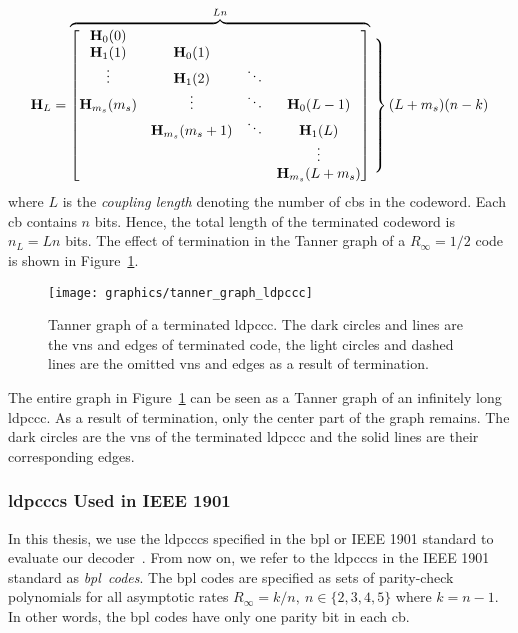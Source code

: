 \begin{align}
\mathbf{H}_L = 
\overbrace{\begin{bmatrix}
  \mathbf{H}_{0}(0)\\
  \mathbf{H}_1(1) &\mathbf{H}_0(1)\\
  \vdots &\mathbf{H}_1(2) &\ddots\\
  \mathbf{H}_{m_s}(m_s) &\vdots &\ddots &\mathbf{H}_0(L-1)\\
  &\mathbf{H}_{m_s}(m_s+1) &\ddots &\mathbf{H}_{1}(L)\\
  & & &\vdots\\
  & & &\mathbf{H}_{m_s}(L+m_s)
\end{bmatrix}}^{Ln}
\left.\begin{matrix}
\\
\\
\\
\\
\\
\\
\\
\\
\end{matrix}\right\}(L+m_s)(n-k)
\end{align}
where $L$ is the \emph{coupling length} denoting the number of \acp{cb} in the codeword. Each \ac{cb} contains $n$ bits. Hence, the total length of the terminated codeword is $n_L=Ln$ bits. The effect of termination in the Tanner graph of a $R_\infty=1/2$ code is shown in Figure~\ref{fig:tannGraphLdpccc}.
\begin{figure}[htbp]
  \centering
  \texttt{[image: graphics/tanner\_graph\_ldpccc]}
  \caption{Tanner graph of a terminated \ac{ldpccc}. The dark circles and lines are the \acp{vn} and edges of terminated code, the light circles and dashed lines are the omitted \acp{vn} and edges as a result of termination.}
  \label{fig:tannGraphLdpccc}
\end{figure}
The entire graph in Figure~\ref{fig:tannGraphLdpccc} can be seen as a Tanner graph of an infinitely long \ac{ldpccc}. As a result of termination, only the center part of the graph remains. The dark circles are the \acp{vn} of the terminated \ac{ldpccc} and the solid lines are their corresponding edges.

\subsubsection{\aclp{ldpccc} Used in IEEE 1901}\label{sec:bpl_bg}
In this thesis, we use the \acp{ldpccc} specified in the \ac{bpl} or IEEE 1901 standard to evaluate our decoder~\cite{Bpl}. From now on, we refer to the \acp{ldpccc} in the IEEE 1901 standard as \emph{\ac{bpl}~codes}. The \ac{bpl} codes are specified as sets of parity-check polynomials for all asymptotic rates $R_\infty=k/n,\ n\in\{2,3,4,5\}$ where $k=n-1$. In other words, the \ac{bpl} codes have only one parity bit in each \ac{cb}. 

